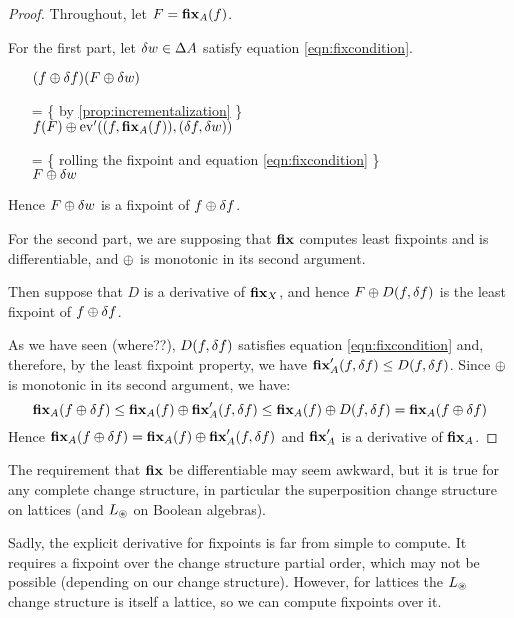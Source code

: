 \newcommand{\thefixpoint}{F}
\newcommand{\theadjustment}{\operatorname{adjust}}

\begin{proof}
  Throughout, let $\thefixpoint = \fixpoint_A(f)$.

  For the first part, let $\delta w \in \Delta A$ satisfy equation \ref{eqn:fixcondition}.
  \begin{itemize}
  \item[ ]
    $
    (f \cplus \change{f})(\thefixpoint \cplus \change{w})
    $
  \item[=]\{ by \ref{prop:incrementalization} \}\\
    $
    f(\thefixpoint)
    \cplus
    \derive{\ev}((f, \fixpoint_A(f)), (\change{f}, \change{w}))
    $
  \item[=]\{ rolling the fixpoint and equation \ref{eqn:fixcondition} \}\\
    $
    \thefixpoint
    \cplus
    \change{w}
    $
  \end{itemize}

  Hence $\thefixpoint \cplus \change{w}$ is a fixpoint of $f \oplus \delta f$.

  For the second part, we are supposing that $\textbf{fix}$ computes least
  fixpoints and is differentiable, and $\oplus$ is monotonic in its second argument.

  Then suppose that $D$ is a derivative of $\textbf{fix}_X$, and hence $\thefixpoint \cplus D(f,
  \change{f})$ is the least fixpoint of $f \oplus \delta f$.

  As we have seen (where??), $D(f, \delta f)$ satisfies equation \ref{eqn:fixcondition} and, therefore,
  by the least fixpoint property, we have $\textbf{fix}_A'(f, \delta f) \leq D(f, \delta f)$.
  Since $\oplus$ is monotonic in its second argument, we have:
  $$
    \textbf{fix}_A(f \oplus \delta f) \leq 
    \textbf{fix}_A(f) \oplus \textbf{fix}_A'(f, \delta f) \leq
    \textbf{fix}_A(f) \oplus D(f, \delta f) = \textbf{fix}_A(f \oplus \delta f)
  $$
  Hence $\textbf{fix}_A(f \oplus \delta f) = \textbf{fix}_A(f) \oplus \textbf{fix}'_A(f, \delta f)$
  and $\textbf{fix}'_A$ is a derivative of $\textbf{fix}_A$.
\end{proof}

The requirement that $\textbf{fix}$ be differentiable may seem awkward, but it is
true for any complete change structure, in particular the superposition change
structure on lattices (and $L_\circledast$ on Boolean algebras).

Sadly, the explicit derivative for fixpoints is far from simple to compute. It requires a fixpoint over the
change structure partial order, which may not be possible (depending on our
change structure). However, for lattices the $L_\circledast$ change structure is
itself a lattice, so we can compute fixpoints over it.

